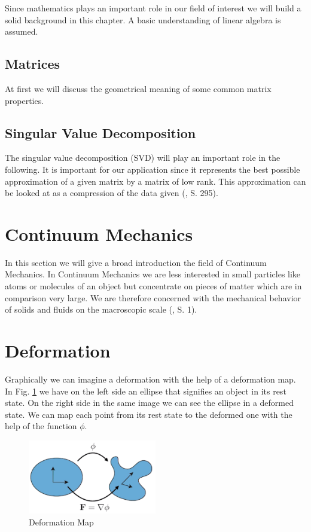 Since mathematics plays an important role in our field of interest we will build a solid background in this chapter. A basic understanding of linear algebra is assumed.

\subsection{Matrices}
At first we will discuss the geometrical meaning of some common matrix properties.


\subsection{Singular Value Decomposition}

The singular value decomposition (SVD) will play an important role in the following. It is important for our application since it represents the best possible approximation of a given matrix by a matrix of low rank. This approximation can be looked at as a compression of the data given (\cite{LiesenMehrmann2015}, S. 295).

\section{Continuum Mechanics}
In this section we will give a broad introduction the field of Continuum Mechanics.
In Continuum Mechanics we are less interested in small particles like atoms or molecules of an object but concentrate on pieces of matter which are in comparison very large. We are therefore concerned with the mechanical behavior of solids and fluids on the macroscopic scale (\cite{Spencer1980}, S. 1).


\section{Deformation}
Graphically we can imagine a deformation with the help of a deformation map. In Fig. \ref{fig:deformationmap} we have on the left side an ellipse that signifies an object in its rest state. On the right side in the same image we can see the ellipse in a deformed state. We can map each point from its rest state to the deformed one with the help of the function $\phi$.

\begin{figure}[!htbp]
	\centering
	\includegraphics[width=0.5\textwidth]{resources/deformation_map}
	\caption{Deformation Map {\cite{STREAM2018}}}
	\label{fig:deformationmap}
\end{figure}

